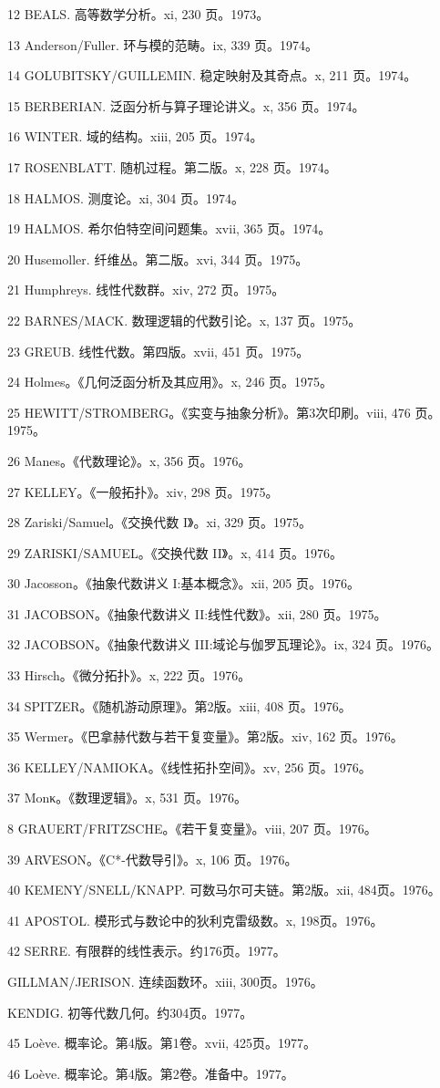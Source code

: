 \documentclass[10pt]{article}
\begin{document}
12 BEALS. 高等数学分析。xi, 230 页。1973。

13 Anderson/Fuller. 环与模的范畴。ix, 339 页。1974。

14 GOLUBITSKY/GUILLEMIN. 稳定映射及其奇点。x, 211 页。1974。

15 BERBERIAN. 泛函分析与算子理论讲义。x, 356 页。1974。

16 WINTER. 域的结构。xiii, 205 页。1974。

17 ROSENBLATT. 随机过程。第二版。x, 228 页。1974。

18 HALMOS. 测度论。xi, 304 页。1974。

19 HALMOS. 希尔伯特空间问题集。xvii, 365 页。1974。

20 Husemoller. 纤维丛。第二版。xvi, 344 页。1975。

21 Humphreys. 线性代数群。xiv, 272 页。1975。

22 BARNES/MACK. 数理逻辑的代数引论。x, 137 页。1975。

23 GREUB. 线性代数。第四版。xvii, 451 页。1975。

24 Holmes。《几何泛函分析及其应用》。x, 246 页。1975。

25 HEWITT/STROMBERG。《实变与抽象分析》。第3次印刷。viii, 476 页。1975。

26 Manes。《代数理论》。x, 356 页。1976。

27 KELLEY。《一般拓扑》。xiv, 298 页。1975。

28 Zariski/Samuel。《交换代数 I》。xi, 329 页。1975。

29 ZARISKI/SAMUEL。《交换代数 II》。x, 414 页。1976。

30 Jacosson。《抽象代数讲义 I:基本概念》。xii, 205 页。1976。

31 JACOBSON。《抽象代数讲义 II:线性代数》。xii, 280 页。1975。

32 JACOBSON。《抽象代数讲义 III:域论与伽罗瓦理论》。ix, 324 页。1976。

33 Hirsch。《微分拓扑》。x, 222 页。1976。

34 SPITZER。《随机游动原理》。第2版。xiii, 408 页。1976。

35 Wermer。《巴拿赫代数与若干复变量》。第2版。xiv, 162 页。1976。

36 KELLEY/NAMIOKA。《线性拓扑空间》。xv, 256 页。1976。

37 Monκ。《数理逻辑》。x, 531 页。1976。

8 GRAUERT/FRITZSCHE。《若干复变量》。viii, 207 页。1976。

39 ARVESON。《C*-代数导引》。x, 106 页。1976。

40 KEMENY/SNELL/KNAPP. 可数马尔可夫链。第2版。xii, 484页。1976。

41 APOSTOL. 模形式与数论中的狄利克雷级数。x, 198页。1976。

42 SERRE. 有限群的线性表示。约176页。1977。

GILLMAN/JERISON. 连续函数环。xiii, 300页。1976。

KENDIG. 初等代数几何。约304页。1977。

45 Loève. 概率论。第4版。第1卷。xvii, 425页。1977。

46 Loève. 概率论。第4版。第2卷。准备中。1977。
\end{document}
